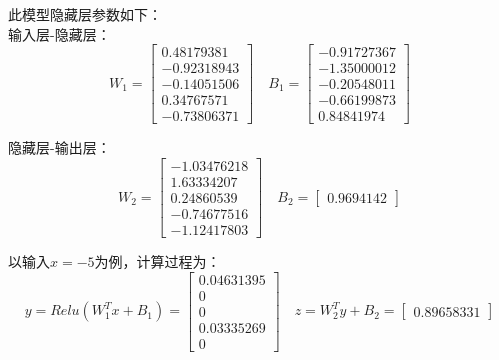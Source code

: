 \documentclass{article}
\begin{document}
此模型隐藏层参数如下：\\

输入层-隐藏层：
\begin{equation}
	W_1=\begin{bmatrix}0.48179381\\ -0.92318943\\ -0.14051506\\  0.34767571\\ -0.73806371\end{bmatrix} \quad 	B_1=\begin{bmatrix} -0.91727367\\
	-1.35000012 \\ -0.20548011\\-0.66199873\\ 0.84841974 \end{bmatrix}
\end{equation}

隐藏层-输出层：
\begin{equation}
	W_2=\begin{bmatrix} -1.03476218\\ 1.63334207\\ 0.24860539\\-0.74677516\\-1.12417803 \end{bmatrix} \quad 	B_2=\begin{bmatrix} 0.9694142\end{bmatrix}
\end{equation}

以输入$ x=-5 $为例，计算过程为：
\begin{equation}
	y=Relu(W_1^Tx+B_1)=\begin{bmatrix} 0.04631395\\ 0 \\0 \\0.03335269\\0\end{bmatrix} \quad 	z=W_2^Ty+B_2=\begin{bmatrix} 0.89658331\end{bmatrix}
\end{equation}
\end{document}
